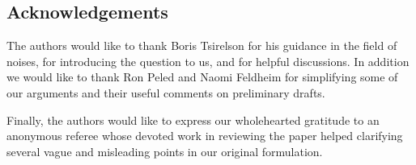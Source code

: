 {
\subsection{Acknowledgements}

The authors would like to thank Boris Tsirelson for his guidance in
the field of noises, for introducing the question to us, and for helpful
discussions.  In addition we would like to thank Ron Peled and Naomi
Feldheim for simplifying some of our arguments and their useful
comments on preliminary drafts.

Finally, the authors would like to express our wholehearted gratitude
to an anonymous referee whose devoted work in reviewing the paper
helped clarifying several vague and misleading points in our original
formulation.
}
